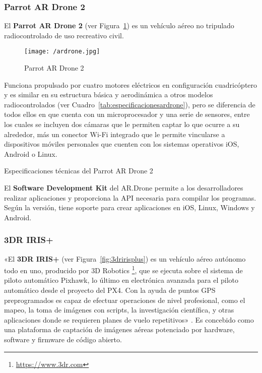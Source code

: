 \subsubsection{Parrot AR Drone 2}
\label{sec:ARDrone}

El \textbf{Parrot AR Drone 2} (ver Figura~\ref{fig:ardrone}) es un vehículo aéreo no tripulado radiocontrolado de uso recreativo civil.

\begin{figure}[!h]
\begin{center}
\texttt{[image: /ardrone.jpg]}
\caption[Parrot AR Drone 2]{Parrot AR Drone 2}
\label{fig:ardrone}
\end{center}
\end{figure} 

Funciona propulsado por cuatro motores eléctricos en configuración cuadricóptero y es similar en su estructura básica y aerodinámica a otros modelos radiocontrolados (ver Cuadro~\ref{tab:especificacionesardrone}), pero se diferencia de todos ellos en que cuenta con un microprocesador y una serie de sensores, entre los cuales se incluyen dos cámaras que le permiten captar lo que ocurre a su alrededor, más un conector Wi-Fi integrado que le permite vincularse a dispositivos móviles personales que cuenten con los sistemas operativos iOS, Android o Linux.

\begin{table}[!h]
 \centering
 {\small
 
 }
 \caption[Especificaciones técnicas del Parrot AR Drone 2]
 {Especificaciones técnicas del Parrot AR Drone 2 \footnotemark}
 \label{tab:especificacionesardrone}
\end{table}


El \textbf{Software Development Kit} del AR.Drone permite a los desarrolladores realizar aplicaciones y proporciona la \acs{API} necesaria para compilar los programas. Según la versión, tiene soporte para crear aplicaciones en iOS, Linux, Windows y Android.

\subsubsection{3DR IRIS+}
\label{sec:3driris}

«El \textbf{3DR IRIS+} (ver Figura~\ref{fig:3dririsplus}) es un vehículo aéreo autónomo todo en uno, producido por 3D Robotics \footnote{\url{https://www.3dr.com}}, que se ejecuta sobre el sistema de piloto automático Pixhawk, lo último en electrónica avanzada para el piloto automático desde el proyecto del PX4. Con la ayuda de puntos \acs{GPS} preprogramados es capaz de efectuar operaciones de nivel profesional, como el mapeo, la toma de imágenes con scripts, la investigación científica, y otras aplicaciones donde se requieren planes de vuelo repetitivos» \cite{3driris}. Es concebido como una plataforma de captación de imágenes aéreas potenciado por hardware, software y firmware de código abierto.

